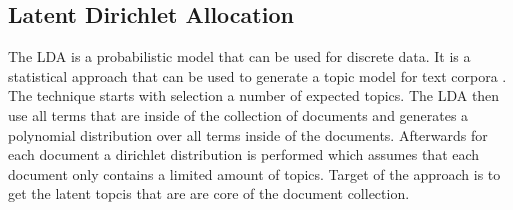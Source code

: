 \subsection{Latent Dirichlet Allocation} %
\label{sub:lda}
The LDA is a probabilistic model that can be used for discrete data. It is a statistical approach that can be used to generate a topic model for text corpora \cite{blei_latent_nodate}. The technique starts with selection a number of expected topics. The LDA then use all terms that are inside of the collection of documents and generates a polynomial distribution over all terms inside of the documents. Afterwards for each document a dirichlet distribution is performed which assumes that each document only contains a limited amount of topics. Target of the approach is to get the latent topcis that are are core of the document collection.
